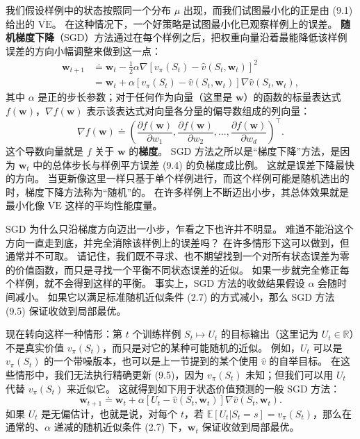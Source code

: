 \documentclass[UTF8,12pt,a4paper,fontset=fandol]{ctexart}
\begin{document}
我们假设样例中的状态按照同一个分布 $\mu$ 出现，而我们试图最小化的正是由 (9.1) 给出的 $\overline{\mathrm{VE}}$。
在这种情况下，一个好策略是试图最小化已观察样例上的误差。
\textbf{随机梯度下降}（SGD）方法通过在每个样例之后，把权重向量沿着最能降低该样例误差的方向小幅调整来做到这一点：
\begin{align}
\mathbf{w}_{t+1}
&\doteq \mathbf{w}_t-\frac{1}{2}\alpha\nabla\!\left[v_\pi(S_t)-\hat{v}(S_t,\mathbf{w}_t)\right]^2 \tag{9.4}\\
&= \mathbf{w}_t+\alpha\left[v_\pi(S_t)-\hat{v}(S_t,\mathbf{w}_t)\right]\nabla\hat{v}(S_t,\mathbf{w}_t),
\tag{9.5}
\end{align}
其中 $\alpha$ 是正的步长参数；对于任何作为向量（这里是 $\mathbf{w}$）的函数的标量表达式 $f(\mathbf{w})$，$\nabla f(\mathbf{w})$ 表示该表达式对向量各分量的偏导数组成的列向量：
\begin{equation}
\nabla f(\mathbf{w})\doteq
\left(
\frac{\partial f(\mathbf{w})}{\partial w_1},
\frac{\partial f(\mathbf{w})}{\partial w_2},
\ldots,
\frac{\partial f(\mathbf{w})}{\partial w_d}
\right)^\top.
\tag{9.6}
\end{equation}
这个导数向量就是 $f$ 关于 $\mathbf{w}$ 的\textbf{梯度}。
SGD 方法之所以是“梯度下降”方法，是因为 $\mathbf{w}_t$ 中的总体步长与样例平方误差 (9.4) 的负梯度成比例。
这就是误差下降最快的方向。
当更新像这里一样只基于单个样例进行，而这个样例可能是随机选出的时，梯度下降方法称为“随机”的。
在许多样例上不断迈出小步，其总体效果就是最小化像 $\overline{\mathrm{VE}}$ 这样的平均性能度量。

SGD 为什么只沿梯度方向迈出一小步，乍看之下也许并不明显。
难道不能沿这个方向一直走到底，并完全消除该样例上的误差吗？
在许多情形下这可以做到，但通常并不可取。
请记住，我们既不寻求、也不期望找到一个对所有状态误差为零的价值函数，而只是寻找一个平衡不同状态误差的近似。
如果一步就完全修正每个样例，就不会得到这样的平衡。
事实上，SGD 方法的收敛结果假设 $\alpha$ 会随时间减小。
如果它以满足标准随机近似条件 (2.7) 的方式减小，那么 SGD 方法 (9.5) 保证收敛到局部最优。

现在转向这样一种情形：第 $t$ 个训练样例 $S_t\mapsto U_t$ 的目标输出（这里记为 $U_t\in\mathbb{R}$）不是真实价值 $v_\pi(S_t)$，而只是对它的某种可能随机的近似。
例如，$U_t$ 可以是 $v_\pi(S_t)$ 的一个带噪版本，也可以是上一节提到的某个使用 $\hat{v}$ 的自举目标。
在这些情形中，我们无法执行精确更新 (9.5)，因为 $v_\pi(S_t)$ 未知；但我们可以用 $U_t$ 代替 $v_\pi(S_t)$ 来近似它。
这就得到如下用于状态价值预测的一般 SGD 方法：
\begin{equation}
\mathbf{w}_{t+1}\doteq
\mathbf{w}_t+\alpha\left[U_t-\hat{v}(S_t,\mathbf{w}_t)\right]\nabla\hat{v}(S_t,\mathbf{w}_t).
\tag{9.7}
\end{equation}
如果 $U_t$ 是无偏估计，也就是说，对每个 $t$，若 $\mathbb{E}[U_t|S_t=s]=v_\pi(S_t)$，那么在通常的、$\alpha$ 递减的随机近似条件 (2.7) 下，$\mathbf{w}_t$ 保证收敛到局部最优。
\end{document}
